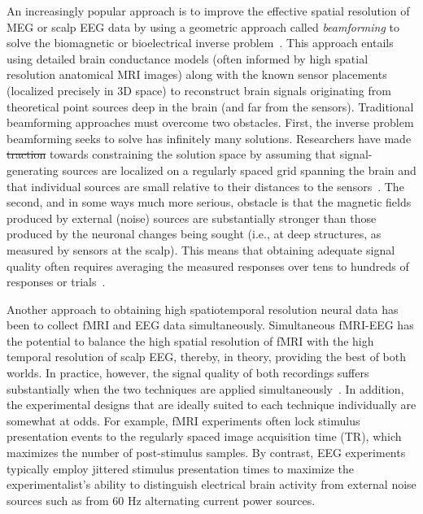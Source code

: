\documentclass[11pt]{article}
\providecommand{\DIFaddtex}[1]{{\protect\color{blue}\uwave{#1}}} %
\providecommand{\DIFdeltex}[1]{{\protect\color{red}\sout{#1}}}                      %
\providecommand{\DIFaddbegin}{} %
\providecommand{\DIFaddend}{} %
\providecommand{\DIFdelbegin}{} %
\providecommand{\DIFdelend}{} %
\providecommand{\DIFadd}[1]{\texorpdfstring{\DIFaddtex{#1}}{#1}} %
\providecommand{\DIFdel}[1]{\texorpdfstring{\DIFdeltex{#1}}{}} %
\newcommand{\DIFscaledelfig}{0.5}
\newlength{\DIFdelgraphicswidth} %
\newlength{\DIFdelgraphicsheight} %
\newcommand{\DIFaddincludegraphics}[2][]{{\color{blue}\fbox{\DIFOincludegraphics[#1]{#2}}}} %
\newcommand{\DIFdelincludegraphics}[2][]{%
\sbox{\DIFdelgraphicsbox}{\DIFOincludegraphics[#1]{#2}}%
\settoboxwidth{\DIFdelgraphicswidth}{\DIFdelgraphicsbox} %
\settoboxtotalheight{\DIFdelgraphicsheight}{\DIFdelgraphicsbox} %
\scalebox{\DIFscaledelfig}{%
\parbox[b]{\DIFdelgraphicswidth}{\usebox{\DIFdelgraphicsbox}\\[-\baselineskip] \rule{\DIFdelgraphicswidth}{0em}}\llap{\resizebox{\DIFdelgraphicswidth}{\DIFdelgraphicsheight}{%
\setlength{\unitlength}{\DIFdelgraphicswidth}%
\begin{picture}(1,1)%
\thicklines\linethickness{2pt} %
{\color[rgb]{1,0,0}\put(0,0){\framebox(1,1){}}}%
{\color[rgb]{1,0,0}\put(0,0){\line( 1,1){1}}}%
{\color[rgb]{1,0,0}\put(0,1){\line(1,-1){1}}}%
\end{picture}%
}\hspace*{3pt}}} %
} %
\DeclareRobustCommand{\DIFaddbegin}{\DIFOaddbegin \let\includegraphics\DIFaddincludegraphics} %
\DeclareRobustCommand{\DIFaddend}{\DIFOaddend \let\includegraphics\DIFOincludegraphics} %
\DeclareRobustCommand{\DIFdelbegin}{\DIFOdelbegin \let\includegraphics\DIFdelincludegraphics} %
\DeclareRobustCommand{\DIFdelend}{\DIFOaddend \let\includegraphics\DIFOincludegraphics} %
\begin{document}
An increasingly popular approach is to improve the effective spatial
resolution of MEG or scalp EEG data by using a geometric approach
called \textit{beamforming} to solve the biomagnetic or bioelectrical
inverse problem~\citep{Sarv87}.  This approach entails using detailed
brain conductance models (often informed by high spatial resolution
anatomical MRI images) along with the known sensor placements
(localized precisely in 3D space) to reconstruct brain signals
originating from theoretical point sources deep in the brain (and far
from the sensors).  Traditional beamforming approaches must overcome
two obstacles.  First, the inverse problem beamforming seeks to solve
has infinitely many solutions.  Researchers have made \DIFdelbegin \DIFdel{traction }\DIFdelend \DIFaddbegin \DIFadd{progress }\DIFaddend towards
constraining the solution space by assuming that signal-generating
sources are localized on a regularly spaced grid spanning the brain
and that individual sources are small relative to their distances to
the sensors~\citep{Snyd91, BailEtal01, HillEtal05}.  The second, and in
some ways much more serious, obstacle is that the magnetic fields
produced by external (noise) sources are substantially stronger than
those produced by the neuronal changes being sought (i.e., at deep
structures, as measured by sensors at the scalp).  This means that
obtaining adequate signal quality often requires averaging the
measured responses over tens to hundreds of responses or trials~\citep[e.g., see review by][]{HillEtal05}.

Another approach to obtaining high spatiotemporal resolution neural data has
been to collect fMRI and EEG data simultaneously. Simultaneous fMRI-EEG has the
potential to balance the high spatial resolution of fMRI with the high temporal
resolution of scalp EEG, thereby, in theory, providing the best of both worlds.
In practice, however, the signal quality of both recordings suffers
substantially when the two techniques are applied simultaneously~\citep[e.g.,
see review by][]{HustEtal12}. In addition, the experimental designs that are
ideally suited to each technique individually are somewhat at odds. For example,
fMRI experiments often lock stimulus presentation events to the regularly spaced
image acquisition time (TR), which maximizes the number of post-stimulus
samples.  By contrast, EEG experiments typically employ jittered stimulus
presentation times to maximize the experimentalist's ability to distinguish
electrical brain activity from external noise sources such as from 60 Hz
alternating current power sources.
\end{document}
